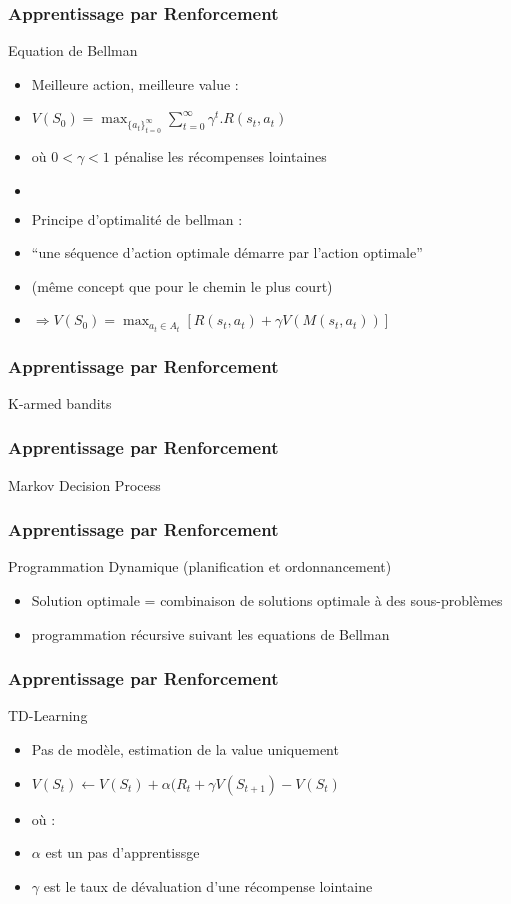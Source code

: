 
\begin{frame}
  \frametitle{Apprentissage par Renforcement}
  Equation de Bellman
  \begin{itemize}
  \item Meilleure action, meilleure value :
  \item $V(S_0) = \max_{{\{a_t\}}_{t=0}^{\infty}}{\sum_{t=0}^{\infty}}\gamma^t.R(s_t,a_t)$
  \item où $0 < \gamma < 1$ pénalise les récompenses lointaines
  \item $\;$
  \item Principe d'optimalité de bellman :
  \item ``une séquence d'action optimale démarre par l'action optimale''
  \item (même concept que pour le chemin le plus court)
  \item $\Rightarrow V(S_0) = \max_{a_t \in A_t}[{R(s_t,a_t)+\gamma V(M(s_t,a_t))}]$
  \end{itemize}
\end{frame}



\begin{frame}
  \frametitle{Apprentissage par Renforcement}
  K-armed bandits
\end{frame}

\begin{frame}
  \frametitle{Apprentissage par Renforcement}
  Markov Decision Process
\end{frame}

\begin{frame}
  \frametitle{Apprentissage par Renforcement}
  Programmation Dynamique (planification et ordonnancement)
  \begin{itemize}
  \item Solution optimale = combinaison de solutions optimale à des sous-problèmes
  \item programmation récursive suivant les equations de Bellman
  \end{itemize}
\end{frame}

\begin{frame}
  \frametitle{Apprentissage par Renforcement}
  TD-Learning
  \begin{itemize}
  \item Pas de modèle, estimation de la value uniquement
  \item $V(S_t) \leftarrow V(S_t) + \alpha(R_t + \gamma V(S_{t+1})-V(S_t)$
  \item où :
  \item $\alpha$ est un pas d'apprentissge
  \item $\gamma$ est le taux de dévaluation d'une récompense lointaine
  \end{itemize}
\end{frame}
